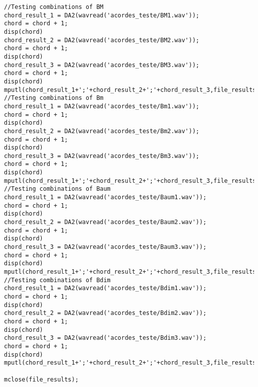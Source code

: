\begin{anexosenv}
\begin{lstlisting}
//Testing combinations of BM
chord_result_1 = DA2(wavread('acordes_teste/BM1.wav'));
chord = chord + 1;
disp(chord)
chord_result_2 = DA2(wavread('acordes_teste/BM2.wav'));
chord = chord + 1;
disp(chord)
chord_result_3 = DA2(wavread('acordes_teste/BM3.wav'));
chord = chord + 1;
disp(chord)
mputl(chord_result_1+';'+chord_result_2+';'+chord_result_3,file_results);
//Testing combinations of Bm
chord_result_1 = DA2(wavread('acordes_teste/Bm1.wav'));
chord = chord + 1;
disp(chord)
chord_result_2 = DA2(wavread('acordes_teste/Bm2.wav'));
chord = chord + 1;
disp(chord)
chord_result_3 = DA2(wavread('acordes_teste/Bm3.wav'));
chord = chord + 1;
disp(chord)
mputl(chord_result_1+';'+chord_result_2+';'+chord_result_3,file_results);
//Testing combinations of Baum
chord_result_1 = DA2(wavread('acordes_teste/Baum1.wav'));
chord = chord + 1;
disp(chord)
chord_result_2 = DA2(wavread('acordes_teste/Baum2.wav'));
chord = chord + 1;
disp(chord)
chord_result_3 = DA2(wavread('acordes_teste/Baum3.wav'));
chord = chord + 1;
disp(chord)
mputl(chord_result_1+';'+chord_result_2+';'+chord_result_3,file_results);
//Testing combinations of Bdim
chord_result_1 = DA2(wavread('acordes_teste/Bdim1.wav'));
chord = chord + 1;
disp(chord)
chord_result_2 = DA2(wavread('acordes_teste/Bdim2.wav'));
chord = chord + 1;
disp(chord)
chord_result_3 = DA2(wavread('acordes_teste/Bdim3.wav'));
chord = chord + 1;
disp(chord)
mputl(chord_result_1+';'+chord_result_2+';'+chord_result_3,file_results);

mclose(file_results);
\end{lstlisting}



\end{anexosenv}
